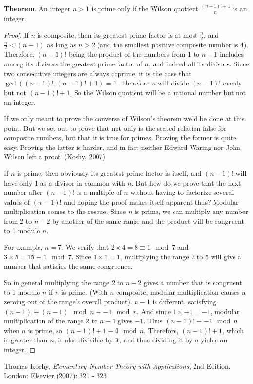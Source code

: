 \documentclass[12pt]{article}
\begin{document}
{\bf Theorem}. An integer $n > 1$ is prime only if the Wilson quotient $\displaystyle \frac{(n - 1)! + 1}{n}$ is an integer.

\begin{proof}
If $n$ is composite, then its greatest prime factor is at most $\displaystyle \frac{n}{2}$, and $\displaystyle \frac{n}{2} < (n - 1)$ as long as $n > 2$ (and the smallest positive composite number is 4). Therefore, $(n - 1)!$ being the product of the numbers from 1 to $n - 1$ includes among its divisors the greatest prime factor of $n$, and indeed all its divisors. Since two consecutive integers are always coprime, it is the case that $\gcd((n - 1)!, (n - 1)! + 1) = 1$. Therefore $n$ will divide $(n - 1)!$ evenly but not $(n - 1)! + 1$. So the Wilson quotient will be a rational number but not an integer.

If we only meant to prove the converse of Wilson's theorem we'd be done at this point. But we set out to prove that not only is the stated relation false for composite numbers, but that it is true for primes. Proving the former is quite easy. Proving the latter is harder, and in fact neither Edward Waring nor John Wilson left a proof. (Koshy, 2007)

If $n$ is prime, then obviously its greatest prime factor is itself, and $(n - 1)!$ will have only 1 as a divisor in common with $n$. But how do we prove that the next number after $(n - 1)!$ is a multiple of $n$ without having to factorize several values of $(n - 1)!$ and hoping the proof makes itself apparent thus? Modular multiplication comes to the rescue. Since $n$ is prime, we can multiply any number from 2 to $n - 2$ by another of the same range and the product will be congruent to 1 modulo $n$.

For example, $n = 7$. We verify that $2 \times 4 = 8 \equiv 1 \mod 7$ and $3 \times 5 = 15 \equiv 1 \mod 7$. Since $1 \times 1 = 1$, multiplying the range 2 to 5 will give a number that satisfies the same congruence.

So in general multiplying the range 2 to $n - 2$ gives a number that is congruent to 1 modulo $n$ if $n$ is prime. (With $n$ composite, modular multiplication causes a zeroing out of the range's overall product). $n - 1$ is different, satisfying $(n - 1) \equiv (n - 1) \mod n \equiv -1 \mod n$. And since $1 \times -1 = -1$, modular multiplication of the range 2 to $n - 1$ gives $-1$. Thus $(n - 1)! \equiv -1 \mod n$ when $n$ is prime, so $(n - 1)! + 1 \equiv 0 \mod n$. Therefore, $(n - 1)! + 1$, which is greater than $n$, is also divisible by it, and thus dividing it by $n$ yields an integer.
\end{proof}

\begin{thebibliography}{1}
 Thomas Kochy, {\it Elementary Number Theory with Applications}, 2nd Edition. London: Elsevier (2007): 321 - 323
\end{thebibliography}
\end{document}
